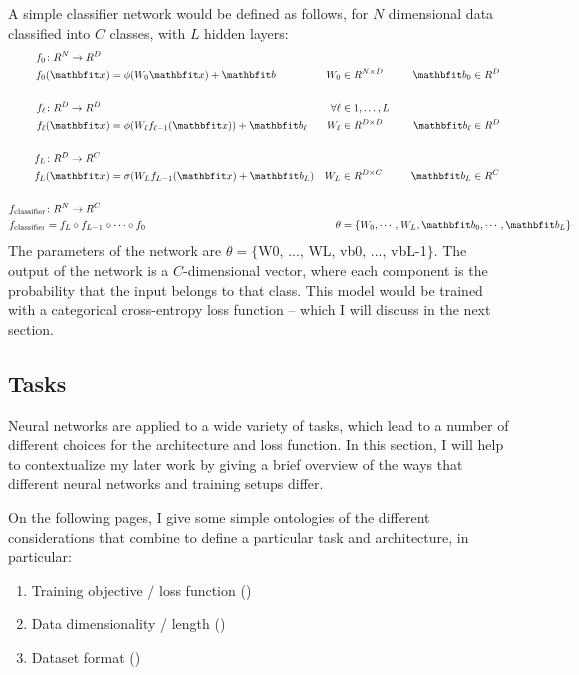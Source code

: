A simple classifier network would be defined as follows, for $N$ dimensional data classified into $C$ classes, with $L$ hidden layers:
\begin{align}
\label{eqn:classifier}
\begin{aligned}
    \vfdef{f_0}{N}{D} \\
    f_{0}&(\x) = \phi(W_0 \x) + \vb &
    W_0 &\in \R^{N\times D} &
    \vb_0 &\in \R^{D}
\\ \\%
    \vfdef{f_\l}{D}{D} & \forall \l &\in 1,\dots,L \quad \\
    f_\l&(\x) = \phi(W_\l f_{\l-1}(\x)) + \vb_\l &
    W_\l &\in \R^{D\times D} \quad &
    \vb_\l &\in \R^{D}
\\ \\%
    \vfdef{f_L}{D}{C} \\
    f_{L}&(\x) = \sigma(W_L f_{L-1}(\x) + \vb_L) &
    W_L &\in \R^{D \times C} &
    \vb_L &\in \R^{C}
\\ \\%
    \vfdef{f_{\text{classifier}}}{N}{C} \\
    f_{\text{classifier}}& = f_L \circ f_{L-1} \circ \cdots \circ f_0 &
    \theta &= \rlap{\{$W_0, \cdots, W_L, \vb_0, \cdots, \vb_L \} $}
\end{aligned}
\end{align}
The parameters of the network are $\theta = \{$W0, ..., WL, vb0, ..., vbL-1$\}$. The output of the network is a $C$-dimensional vector, where each component is the probability that the input belongs to that class. This model would be trained with a categorical cross-entropy loss function -- which I will discuss in the next section.

\vspace{5cm}

\pagebreak

\subsection{Tasks}

Neural networks are applied to a wide variety of tasks, which lead to a number of different choices for the architecture and loss function. In this section, I will help to contextualize my later work by giving a brief overview of the ways that different neural networks and training setups differ.

On the following pages, I give some simple ontologies of the different considerations that combine to define a particular task and architecture, in particular:
\begin{enumerate}
    \item Training objective / loss function ()
    \item Data dimensionality / length ()
    \item Dataset format ()
\end{enumerate}

